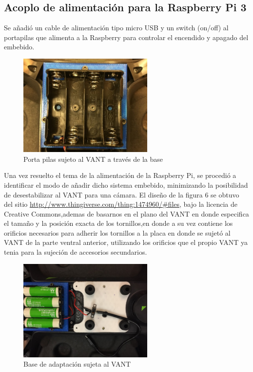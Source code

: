 \documentclass[]{report}
\begin{document}
\subsection{Acoplo de alimentación para la Raspberry Pi 3}

Se añadió un cable de alimentación tipo micro USB y un switch (on/off) al portapilas que alimenta a la Raspberry para controlar el encendido y apagado del embebido.
\begin{figure}[!h]
	\centering
	\includegraphics[width=0.6\textwidth]{cinco}
	\caption{Porta pilas sujeto al VANT a través de la base}
	\label{Anclaje total}
\end{figure}

Una vez resuelto el tema de la alimentación de la Raspberry Pi, se procedió a identificar el modo de añadir dicho sistema embebido, minimizando la posibilidad de desestabilizar al VANT para una cámara. El diseño de la figura 6 se obtuvo del sitio  \url{http://www.thingiverse.com/thing:1474960/#files}, bajo la licencia de Creative Commons,ademas de basarnos en el plano del VANT en donde especifica el tamaño y la posición exacta de los tornillos,en donde a su vez contiene los orificios necesarios para adherir los tornillos a la placa en donde se sujetó al VANT de la parte ventral anterior, utilizando los orificios que el propio VANT ya tenia para la sujeción de accesorios secundarios.
\begin{figure}[!h]
	\centering
	\includegraphics[width=0.6\textwidth]{ocho}
	\caption{Base de adaptación sujeta al VANT}
	\label{Base de Vant y pila}
\end{figure}
\end{document}
